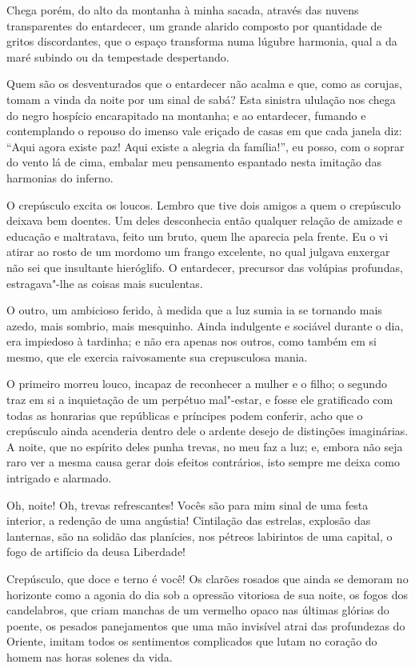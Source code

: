 Chega porém, do alto da montanha à minha sacada, através das nuvens
transparentes do entardecer, um grande alarido composto por 
quantidade de gritos discordantes, que o espaço transforma numa lúgubre harmonia, qual a da maré subindo ou da tempestade despertando.

Quem são os desventurados que o entardecer não acalma e que, como as
corujas, tomam a vinda da noite por um sinal de sabá? Esta sinistra
ululação nos chega do negro hospício encarapitado na montanha; e
ao entardecer, fumando e contemplando o repouso do imenso vale eriçado
de casas em que cada janela diz: ``Aqui agora existe paz!
Aqui existe a alegria da família!'', eu posso, com o
soprar do vento lá de cima, embalar meu pensamento espantado nesta imitação
das harmonias do inferno.

O crepúsculo excita os loucos. Lembro que tive dois amigos a quem o
crepúsculo deixava bem doentes. Um deles desconhecia então qualquer
relação de amizade e educação e maltratava, feito um bruto,
quem lhe aparecia pela frente. Eu o vi atirar ao rosto de um
mordomo um frango excelente, no qual julgava enxergar não sei que
insultante hieróglifo. O entardecer, precursor das volúpias profundas,
estragava"-lhe as coisas mais suculentas.

O outro, um ambicioso ferido, à medida que a luz sumia
ia se tornando mais azedo, mais sombrio, mais mesquinho. Ainda indulgente e sociável
durante o dia, era impiedoso à tardinha; e não era apenas nos outros,
como também em si mesmo, que ele exercia raivosamente sua 
crepusculosa mania.

O primeiro morreu louco, incapaz de reconhecer a mulher e o filho; o
segundo traz em si a inquietação de um perpétuo mal"-estar, e fosse
ele gratificado com todas as honrarias que repúblicas
e príncipes podem conferir, acho que o crepúsculo ainda acenderia dentro dele o ardente
desejo de distinções imaginárias. A noite, que no 
espírito deles punha trevas, no meu faz a luz; e, embora não seja raro ver a mesma
causa gerar dois efeitos contrários, isto sempre me deixa como 
intrigado e alarmado.

Oh, noite! Oh, trevas refrescantes! Vocês são para mim sinal de uma
festa interior, a redenção de uma angústia! Cintilação das
estrelas, explosão das lanternas, são na solidão das
planícies, nos pétreos labirintos de uma capital, o fogo de artifício da
deusa Liberdade!

Crepúsculo, que doce e terno é você! Os clarões rosados que ainda se
demoram no horizonte como a agonia do dia sob a opressão
vitoriosa de sua noite, os fogos dos candelabros, que criam manchas de
um vermelho opaco nas últimas glórias do poente, 
os pesados panejamentos que uma mão invisível atrai das profundezas do Oriente,
imitam todos os sentimentos complicados que lutam no coração do homem
nas horas solenes da vida.

